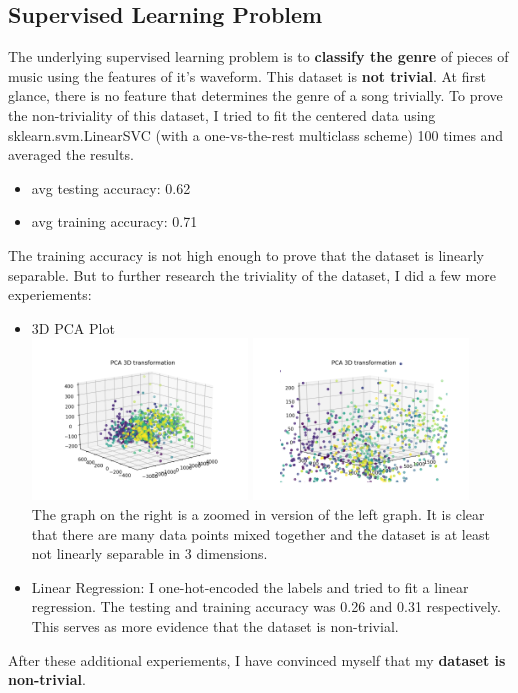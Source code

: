 \documentclass[12pt]{article}
\begin{document}
\subsection{Supervised Learning Problem}
The underlying supervised learning problem is to \textbf{classify the genre} of pieces of music using the features of it's waveform. This dataset is \textbf{not trivial}. At first glance, there is no feature that determines the genre of a song trivially. To prove the non-triviality of this dataset, I tried to fit the centered data using sklearn.svm.LinearSVC (with a one-vs-the-rest multiclass scheme) 100 times and averaged the results.
\begin{itemize}
    \item avg testing accuracy: 0.62
    \item avg training accuracy: 0.71
\end{itemize}
The training accuracy is not high enough to prove that the dataset is linearly separable. But to further research the triviality of the dataset, I did a few more experiements:
\begin{itemize}
    \item 3D PCA Plot
    \\ \includegraphics[width=0.45\textwidth]{pca0} \includegraphics[width=0.45\textwidth]{pca1}
    \\ The graph on the right is a zoomed in version of the left graph. It is clear that there are many data points mixed together and the dataset is at least not linearly separable in 3 dimensions.
    \item Linear Regression: I one-hot-encoded the labels and tried to fit a linear regression. The testing and training accuracy was 0.26 and 0.31 respectively. This serves as more evidence that the dataset is non-trivial.
\end{itemize}
After these additional experiements, I have convinced myself that my \textbf{dataset is non-trivial}.
\end{document}
